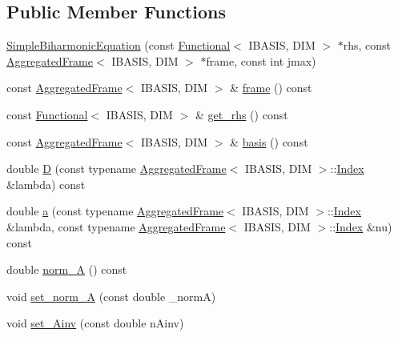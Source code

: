 \subsection*{Public Member Functions}
\begin{CompactItemize}
\item 
\hyperlink{classFrameTL_1_1SimpleBiharmonicEquation_ef39e6a2ad2a5ba99862edf485ea0466}{SimpleBiharmonicEquation} (const \hyperlink{classFrameTL_1_1Functional}{Functional}$<$ IBASIS, DIM $>$ $\ast$rhs, const \hyperlink{classFrameTL_1_1AggregatedFrame}{AggregatedFrame}$<$ IBASIS, DIM $>$ $\ast$frame, const int jmax)
\item 
const \hyperlink{classFrameTL_1_1AggregatedFrame}{AggregatedFrame}$<$ IBASIS, DIM $>$ \& \hyperlink{classFrameTL_1_1SimpleBiharmonicEquation_bc2645843910a5f7021eba52f5f6c017}{frame} () const 
\item 
const \hyperlink{classFrameTL_1_1Functional}{Functional}$<$ IBASIS, DIM $>$ \& \hyperlink{classFrameTL_1_1SimpleBiharmonicEquation_37ff3b226a0d77e00319bab67159632b}{get\_\-rhs} () const 
\item 
const \hyperlink{classFrameTL_1_1AggregatedFrame}{AggregatedFrame}$<$ IBASIS, DIM $>$ \& \hyperlink{classFrameTL_1_1SimpleBiharmonicEquation_27aa32bf09583eaccb85c02a83ace799}{basis} () const 
\item 
double \hyperlink{classFrameTL_1_1SimpleBiharmonicEquation_0b1b68d78e17e9686b8feb3b899b572f}{D} (const typename \hyperlink{classFrameTL_1_1AggregatedFrame}{AggregatedFrame}$<$ IBASIS, DIM $>$::\hyperlink{classFrameTL_1_1FrameIndex}{Index} \&lambda) const 
\item 
double \hyperlink{classFrameTL_1_1SimpleBiharmonicEquation_736592304b02f99e4a44068508072d89}{a} (const typename \hyperlink{classFrameTL_1_1AggregatedFrame}{AggregatedFrame}$<$ IBASIS, DIM $>$::\hyperlink{classFrameTL_1_1FrameIndex}{Index} \&lambda, const typename \hyperlink{classFrameTL_1_1AggregatedFrame}{AggregatedFrame}$<$ IBASIS, DIM $>$::\hyperlink{classFrameTL_1_1FrameIndex}{Index} \&nu) const 
\item 
double \hyperlink{classFrameTL_1_1SimpleBiharmonicEquation_af3683e5652a266466d453da0f35f259}{norm\_\-A} () const 
\item 
void \hyperlink{classFrameTL_1_1SimpleBiharmonicEquation_23b65b1275ee7a30d046306fe45cf565}{set\_\-norm\_\-A} (const double \_\-normA)
\item 
void \hyperlink{classFrameTL_1_1SimpleBiharmonicEquation_5b4d7267cb0773deeef602164671aec8}{set\_\-Ainv} (const double nAinv)

\end{CompactItemize}
